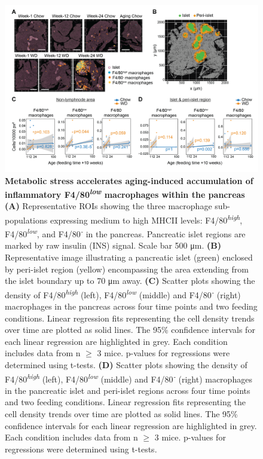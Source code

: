 \begin{figure}[!t]
    \centering
    \includegraphics[width=\linewidth]{Chapter4/Fig/F2-9-01.png}
    \caption[res-imc2]{\textbf{Metabolic stress accelerates aging-induced accumulation of inflammatory F4/80\textsuperscript{\textit{low}} macrophages within the pancreas}\\
    \textbf{(A)} Representative ROIs showing the three macrophage sub-populations expressing medium to high MHCII levels: F4/80\textsuperscript{\textit{high}}, F4/80\textsuperscript{\textit{low}}, and F4/80\textsuperscript{\textit{-}} in the pancreas. Pancreatic islet regions are marked by raw insulin (INS) signal. Scale bar 500 μm. \textbf{(B)} Representative image illustrating a pancreatic islet (green) enclosed by peri-islet region (yellow) encompassing the area extending from the islet boundary up to 70 μm away. \textbf{(C)} Scatter plots showing the density of F4/80\textsuperscript{\textit{high}} (left), F4/80\textsuperscript{\textit{low}} (middle) and F4/80\textsuperscript{\textit{-}} (right) macrophages in the pancreas across four time points and two feeding conditions. Linear regression fits representing the cell density trends over time are plotted as solid lines. The 95\% confidence intervals for each linear regression are highlighted in grey. Each condition includes data from n $\geq$ 3 mice. p-values for regressions were determined using t-tests. \textbf{(D)} Scatter plots showing the density of F4/80\textsuperscript{\textit{high}} (left), F4/80\textsuperscript{\textit{low}} (middle) and F4/80\textsuperscript{\textit{-}} (right) macrophages in the pancreatic islet and peri-islet regions across four time points and two feeding conditions. Linear regression fits representing the cell density trends over time are plotted as solid lines. The 95\% confidence intervals for each linear regression are highlighted in grey. Each condition includes data from n $\geq$ 3 mice. p-values for regressions were determined using t-tests.}
    \label{fig2-9}
\end{figure}

